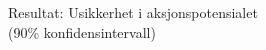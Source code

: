 \documentclass[presentation]{beamer}
\begin{document}
\begin{frame}{Resultat: Usikkerhet i aksjonspotensialet \\(90\% konfidensintervall)}
   \vspace{-5mm}
\begin{figure}
\end{figure}
\end{frame}



\end{document}
